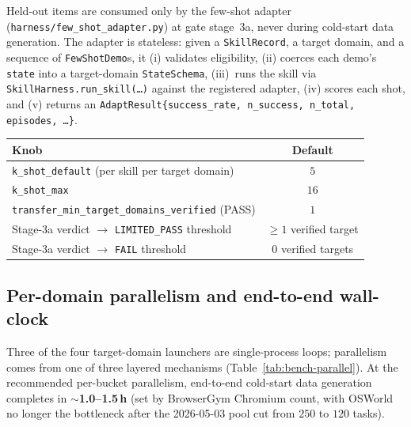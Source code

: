 Held-out items are consumed only by the few-shot adapter
(\texttt{harness/few\_shot\_adapter.py}) at gate stage~3a, never during
cold-start data generation. The adapter is stateless: given a
\texttt{SkillRecord}, a target domain, and a sequence of
\texttt{FewShotDemo}s, it (i) validates eligibility, (ii) coerces each
demo's \texttt{state} into a target-domain \texttt{StateSchema},
(iii)~runs the skill via \texttt{SkillHarness.run\_skill(\dots)}
against the registered adapter, (iv) scores each shot, and (v) returns
an \texttt{AdaptResult\{success\_rate, n\_success, n\_total, episodes,
\dots\}}.
\begin{center}
\small
\begin{tabular}{@{}lc@{}}
\toprule
\textbf{Knob} & \textbf{Default} \\
\midrule
\texttt{k\_shot\_default} (per skill per target domain) & $5$  \\
\texttt{k\_shot\_max}                                   & $16$ \\
\texttt{transfer\_min\_target\_domains\_verified} (PASS) & $1$ \\
Stage-3a verdict $\to$ \texttt{LIMITED\_PASS} threshold & $\geq 1$ verified target \\
Stage-3a verdict $\to$ \texttt{FAIL} threshold          & $0$ verified targets \\
\bottomrule
\end{tabular}
\end{center}

\subsection{Per-domain parallelism and end-to-end wall-clock}
\label{app:bench-parallelism}

Three of the four target-domain launchers are single-process loops;
parallelism comes from one of three layered mechanisms
(Table~\ref{tab:bench-parallel}). At the recommended per-bucket
parallelism, end-to-end cold-start data generation completes in
\textbf{$\sim$1.0--1.5\,h} (set by BrowserGym Chromium count, with
OSWorld no longer the bottleneck after the 2026-05-03 pool cut from
$250$ to $120$ tasks).

